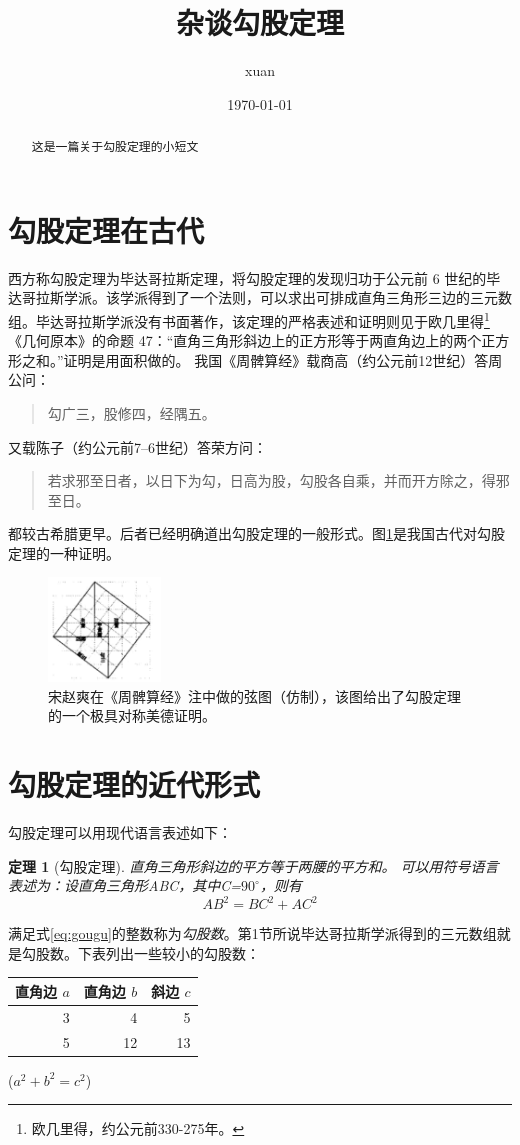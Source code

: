 \documentclass[UTF8]{ctexart}
\title{\heiti 杂谈勾股定理}
\author{\kaishu xuan}
\date{\today}
\newtheorem{thm}{定理}
\begin{document}
\maketitle
\newenvironment{myquote}{\begin{quote}\kaishu\zihao{-5}}{\end{quote}}
\newcommand{\degree}{^\circ}


\begin{abstract}
这是一篇关于勾股定理的小短文
\end{abstract}
\tableofcontents
\section{勾股定理在古代}
西方称勾股定理为毕达哥拉斯定理，将勾股定理的发现归功于公元前 6 世纪的毕达哥拉斯学派\cite{Kline}。该学派得到了一个法则，可以求出可排成直角三角形三边的三元数组。毕达哥拉斯学派没有书面著作，该定理的严格表述和证明则见于欧几里得\footnote{欧几里得，约公元前330-275年。}《几何原本》的命题 47：“直角三角形斜边上的正方形等于两直角边上的两个正方形之和。”证明是用面积做的。
我国《周髀算经》载商高（约公元前12世纪）答周公问：
\begin{myquote}
勾广三，股修四，经隅五。
\end{myquote}
又载陈子（约公元前7--6世纪）答荣方问：
\begin{myquote}
若求邪至日者，以日下为勾，日高为股，勾股各自乘，并而开方除之，得邪至日。
\end{myquote}
都较古希腊更早。后者已经明确道出勾股定理的一般形式。图\ref{fig:gougu}是我国古代对勾股定理的一种证明\cite{quanjing}。 
\begin{figure}[ht]
  \centering
  \includegraphics[width=3cm]{gougu.png}
  \caption {\kaishu{} 宋赵爽在《周髀算经》注中做的弦图（仿制），该图给出了勾股定理的一个极具对称美德证明。}
  \label{fig:gougu}
\end{figure}


\section{勾股定理的近代形式}
勾股定理可以用现代语言表述如下：
\begin{thm}[勾股定理]
直角三角形斜边的平方等于两腰的平方和。
可以用符号语言表述为：设直角三角形ABC，其中\angle C=$90\degree$，则有
\begin{equation} \label{eq:gougu}
AB^2 = BC^2 + AC^2
\end{equation}
\end{thm}

满足式\eqref{eq:gougu}的整数称为\emph{勾股数}。第1节所说毕达哥拉斯学派得到的三元数组就是勾股数。下表列出一些较小的勾股数：
\begin{table}[h]
\begin{tabular}{|rrr|}
\hline
直角边 $a$ & 直角边 $b$ & 斜边 $c$\\
\hline
3 &  4 & 5\\
5 &  12&  13\\
\hline
\end{tabular}%
\qquad
($a^2 + b^2 = c^2$)
\end{table}
\nocite{Shiye}

\end{document}
